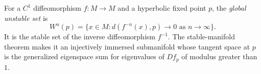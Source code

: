 
For a $C^1$ diffeomorphism $f:M\to M$ and a hyperbolic fixed point $p$, the \emph{global unstable set} is
\[
W^u(p)=\{x\in M:d(f^{-n}(x),p)\to0\text{ as }n\to\infty\}.
\]
It is the stable set of the inverse diffeomorphism $f^{-1}$. The stable-manifold theorem makes it an injectively immersed submanifold whose tangent space at $p$ is the generalized eigenspace sum for eigenvalues of $Df_p$ of modulus greater than $1$.
